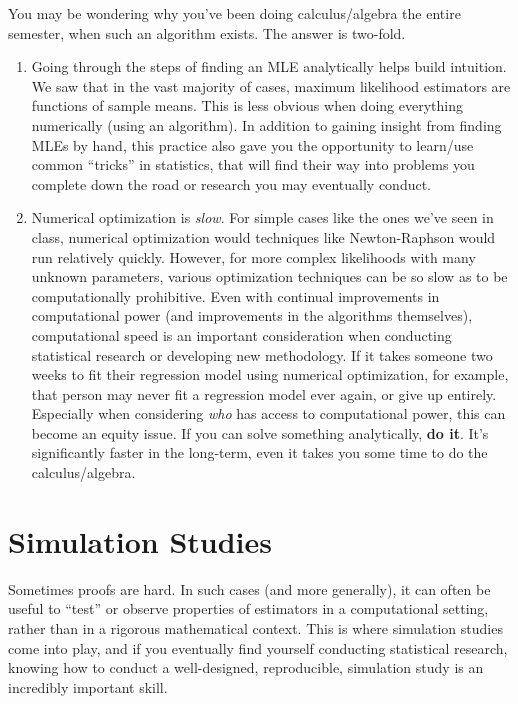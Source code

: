 \documentclass[
  letterpaper,
  DIV=11,
  numbers=noendperiod]{scrreprt}
\begin{document}
You may be wondering why you've been doing calculus/algebra the entire
semester, when such an algorithm exists. The answer is two-fold.

\begin{enumerate}
\def\labelenumi{\arabic{enumi}.}
\item
  Going through the steps of finding an MLE analytically helps build
  intuition. We saw that in the vast majority of cases, maximum
  likelihood estimators are functions of sample means. This is less
  obvious when doing everything numerically (using an algorithm). In
  addition to gaining insight from finding MLEs by hand, this practice
  also gave you the opportunity to learn/use common ``tricks'' in
  statistics, that will find their way into problems you complete down
  the road or research you may eventually conduct.
\item
  Numerical optimization is \emph{slow}. For simple cases like the ones
  we've seen in class, numerical optimization would techniques like
  Newton-Raphson would run relatively quickly. However, for more complex
  likelihoods with many unknown parameters, various optimization
  techniques can be so slow as to be computationally prohibitive. Even
  with continual improvements in computational power (and improvements
  in the algorithms themselves), computational speed is an important
  consideration when conducting statistical research or developing new
  methodology. If it takes someone two weeks to fit their regression
  model using numerical optimization, for example, that person may never
  fit a regression model ever again, or give up entirely. Especially
  when considering \emph{who} has access to computational power, this
  can become an equity issue. If you can solve something analytically,
  \textbf{do it}. It's significantly faster in the long-term, even it
  takes you some time to do the calculus/algebra.
\end{enumerate}

\section{Simulation Studies}\label{simulation-studies}

Sometimes proofs are hard. In such cases (and more generally), it can
often be useful to ``test'' or observe properties of estimators in a
computational setting, rather than in a rigorous mathematical context.
This is where simulation studies come into play, and if you eventually
find yourself conducting statistical research, knowing how to conduct a
well-designed, reproducible, simulation study is an incredibly important
skill.
\end{document}
